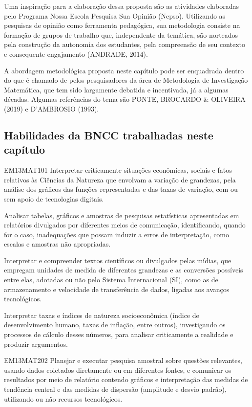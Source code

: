 \begin{apresentacao}
Uma inspiração para a elaboração dessa proposta são as atividades elaboradas pelo Programa Nossa Escola Pesquisa Sua Opinião (Nepso). Utilizando as pesquisas de opinião como ferramenta pedagógica, sua metodologia consiste na formação de grupos de trabalho que, independente da temática, são norteados pela construção da autonomia dos estudantes, pela compreensão de seu contexto e consequente engajamento (ANDRADE, 2014).

A abordagem metodológica proposta neste capítulo pode ser enquadrada dentro do que é chamado de pelos pesquisadores da área de Metodologia de Investigação Matemática, que tem sido largamente debatida e incentivada, já a algumas décadas. Algumas referências do tema são PONTE, BROCARDO \& OLIVEIRA (2019) e D’AMBROSIO (1993). 

\subsection{Habilidades da BNCC trabalhadas neste capítulo}

\begin{habilities}{EM13MAT101}
Interpretar criticamente situações econômicas, sociais e fatos relativos às Ciências da Natureza que envolvam a variação de grandezas, pela análise dos gráficos das funções representadas e das taxas de variação, com ou sem apoio de tecnologias digitais.

Analisar tabelas, gráficos e amostras de pesquisas estatísticas apresentadas em relatórios divulgados por diferentes meios de comunicação, identificando, quando for o caso, inadequações que possam induzir a erros de interpretação, como escalas e amostras não apropriadas. 

Interpretar e compreender textos científicos ou divulgados pelas mídias, que empregam unidades de medida de diferentes grandezas e as conversões possíveis entre elas, adotadas ou não pelo Sistema Internacional (SI), como as de armazenamento e velocidade de transferência de dados, ligadas aos avanços tecnológicos. 

Interpretar taxas e índices de natureza socioeconômica (índice de desenvolvimento humano, taxas de inflação, entre outros), investigando os processos de cálculo desses números, para analisar criticamente a realidade e produzir argumentos.
\end{habilities}

\begin{habilities}{EM13MAT202}
Planejar e executar pesquisa amostral sobre questões relevantes, usando dados coletados diretamente ou em diferentes fontes, e comunicar os resultados por meio de relatório contendo gráficos e interpretação das medidas de tendência central e das medidas de dispersão (amplitude e desvio padrão), utilizando ou não recursos tecnológicos.
\end{habilities}


\end{apresentacao}
